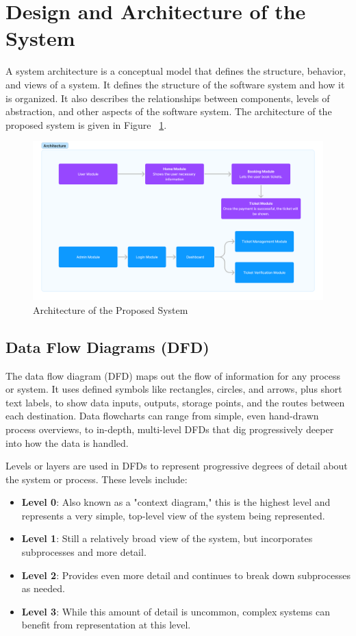 \documentclass[12pt,a4paper]{report}
\begin{document}
\section{Design and Architecture of the System}
A system architecture is a conceptual model that defines the structure, behavior, and views of a system. It defines the structure of the software system and how it is organized. It also describes the relationships between components, levels of abstraction, and other aspects of the software system. The architecture of the proposed system is given in Figure ~\ref{architecture}.
\begin{figure}[h]
    \centering
    \includegraphics[width=\textwidth]{assets/Architecture.png}
    \caption{Architecture of the Proposed System}
    \label{architecture}
\end{figure}

\subsection{Data Flow Diagrams (DFD)}
The data flow diagram (DFD) maps out the flow of information for any process or system. It uses defined symbols like rectangles, circles, and arrows, plus short text labels, to show data inputs, outputs, storage points, and the routes between each destination. Data flowcharts can range from simple, even hand-drawn process overviews, to in-depth, multi-level DFDs that dig progressively deeper into how the data is handled.

Levels or layers are used in DFDs to represent progressive degrees of detail about the system or process. These levels include:
\begin{itemize}
    \item \textbf{Level 0}: Also known as a "context diagram," this is the highest level and represents a very simple, top-level view of the system being represented.
    \item \textbf{Level 1}: Still a relatively broad view of the system, but incorporates subprocesses and more detail.
    \item \textbf{Level 2}: Provides even more detail and continues to break down subprocesses as needed.
    \item \textbf{Level 3}: While this amount of detail is uncommon, complex systems can benefit from representation at this level.
\end{itemize}
\end{document}
